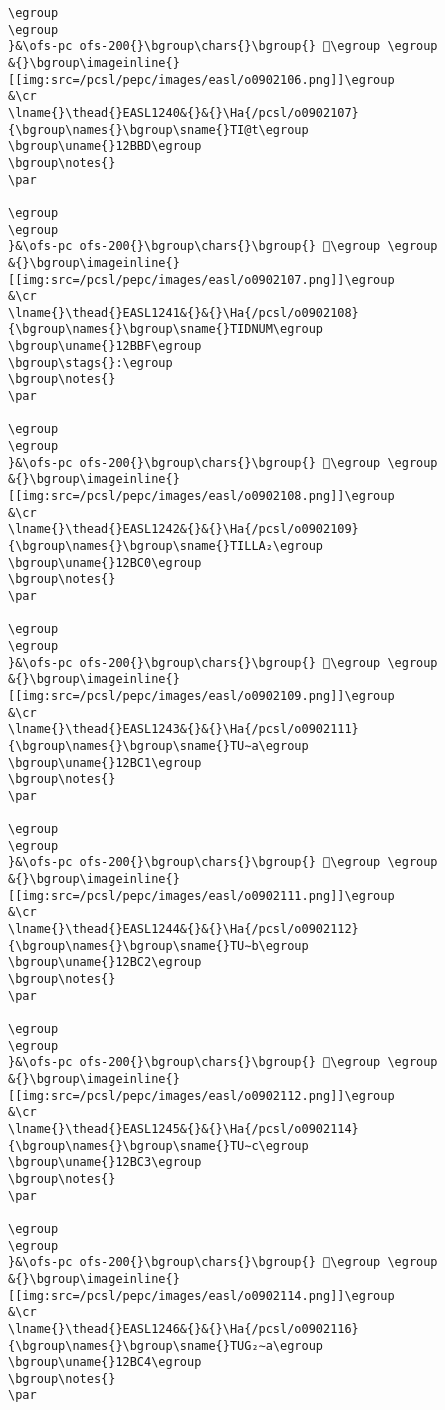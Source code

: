 \begin{verbatim}
\egroup
\egroup
}&\ofs-pc ofs-200{}\bgroup\chars{}\bgroup{} 𒮼\egroup \egroup
&{}\bgroup\imageinline{}[[img:src=/pcsl/pepc/images/easl/o0902106.png]]\egroup
&\cr
\lname{}\thead{}EASL1240&{}&{}\Ha{/pcsl/o0902107}{\bgroup\names{}\bgroup\sname{}TI@t\egroup
\bgroup\uname{}12BBD\egroup
\bgroup\notes{}
\par 

\egroup
\egroup
}&\ofs-pc ofs-200{}\bgroup\chars{}\bgroup{} 𒮽\egroup \egroup
&{}\bgroup\imageinline{}[[img:src=/pcsl/pepc/images/easl/o0902107.png]]\egroup
&\cr
\lname{}\thead{}EASL1241&{}&{}\Ha{/pcsl/o0902108}{\bgroup\names{}\bgroup\sname{}TIDNUM\egroup
\bgroup\uname{}12BBF\egroup
\bgroup\stags{}:\egroup
\bgroup\notes{}
\par 

\egroup
\egroup
}&\ofs-pc ofs-200{}\bgroup\chars{}\bgroup{} 𒮿\egroup \egroup
&{}\bgroup\imageinline{}[[img:src=/pcsl/pepc/images/easl/o0902108.png]]\egroup
&\cr
\lname{}\thead{}EASL1242&{}&{}\Ha{/pcsl/o0902109}{\bgroup\names{}\bgroup\sname{}TILLA₂\egroup
\bgroup\uname{}12BC0\egroup
\bgroup\notes{}
\par 

\egroup
\egroup
}&\ofs-pc ofs-200{}\bgroup\chars{}\bgroup{} 𒯀\egroup \egroup
&{}\bgroup\imageinline{}[[img:src=/pcsl/pepc/images/easl/o0902109.png]]\egroup
&\cr
\lname{}\thead{}EASL1243&{}&{}\Ha{/pcsl/o0902111}{\bgroup\names{}\bgroup\sname{}TU∼a\egroup
\bgroup\uname{}12BC1\egroup
\bgroup\notes{}
\par 

\egroup
\egroup
}&\ofs-pc ofs-200{}\bgroup\chars{}\bgroup{} 𒯁\egroup \egroup
&{}\bgroup\imageinline{}[[img:src=/pcsl/pepc/images/easl/o0902111.png]]\egroup
&\cr
\lname{}\thead{}EASL1244&{}&{}\Ha{/pcsl/o0902112}{\bgroup\names{}\bgroup\sname{}TU∼b\egroup
\bgroup\uname{}12BC2\egroup
\bgroup\notes{}
\par 

\egroup
\egroup
}&\ofs-pc ofs-200{}\bgroup\chars{}\bgroup{} 𒯂\egroup \egroup
&{}\bgroup\imageinline{}[[img:src=/pcsl/pepc/images/easl/o0902112.png]]\egroup
&\cr
\lname{}\thead{}EASL1245&{}&{}\Ha{/pcsl/o0902114}{\bgroup\names{}\bgroup\sname{}TU∼c\egroup
\bgroup\uname{}12BC3\egroup
\bgroup\notes{}
\par 

\egroup
\egroup
}&\ofs-pc ofs-200{}\bgroup\chars{}\bgroup{} 𒯃\egroup \egroup
&{}\bgroup\imageinline{}[[img:src=/pcsl/pepc/images/easl/o0902114.png]]\egroup
&\cr
\lname{}\thead{}EASL1246&{}&{}\Ha{/pcsl/o0902116}{\bgroup\names{}\bgroup\sname{}TUG₂∼a\egroup
\bgroup\uname{}12BC4\egroup
\bgroup\notes{}
\par 


\end{verbatim}
